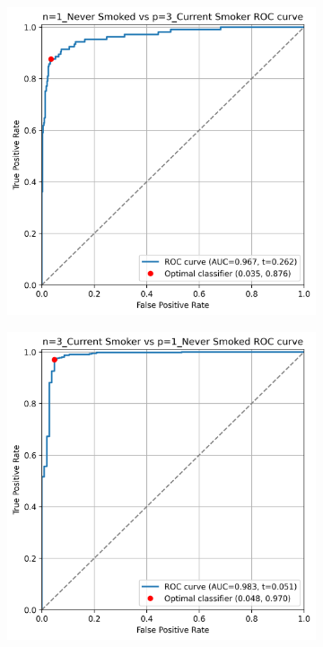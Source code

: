 \documentclass[draft]{article} %
\begin{document}
\begin{figure}[p]
    \centering
    \begin{subfigure}{0.46\linewidth}
        \centering
        \includegraphics[width=\linewidth]{cohort2/test_1v3_roc.png}
    \end{subfigure}
    \hspace{4mm}
    \begin{subfigure}{0.46\linewidth}
        \centering
        \includegraphics[width=\linewidth]{cohort2/test_3v1_roc.png}
    \end{subfigure}


\end{figure}
\end{document}
